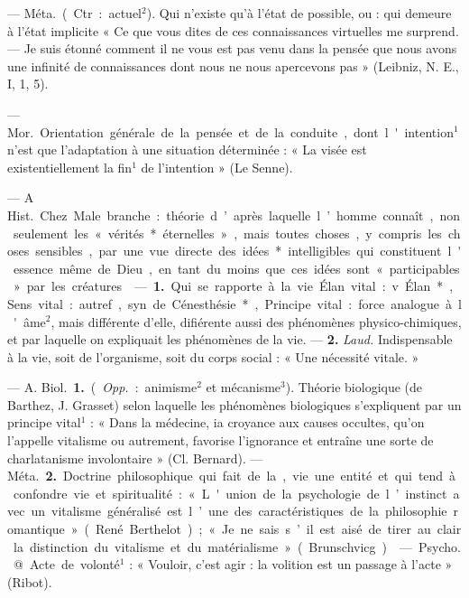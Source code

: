 \begin{itemize}[leftmargin=1cm, label=, itemsep=1pt]
 — \si{Méta.} (Ctr. : actuel$^2$). Qui
n'existe qu’à l’état de possible, ou :
qui demeure à l’état implicite
« Ce que vous dites de ces connaissances virtuelles me surprend. —
Je suis étonné comment il ne vous
est pas venu dans la pensée que
nous avons une infinité de connaissances dont nous ne nous apercevons pas » (Leibniz, N. E., I, 1, 5).

 — \si{Mor.} Orientation générale
de la pensée et de la conduite, dont
l'intention$^1$ n’est que l'adaptation à
une situation déterminée : « La
visée est existentiellement la fin$^1$ de
l'intention » (Le Senne).

 — A \si{Hist.} Chez Male
branche : théorie d’après laquelle
l’homme connaît, non seulement les
« vérités* éternelles », mais toutes
choses, y compris les choses sensibles, par une vue directe des idées*
intelligibles qui constituent l'essence
même de Dieu, en tant du moins
que ces idées sont « participables »
par les créatures.

 — {\bf 1.} Qui se rapporte à la vie.
Élan vital : v. Élan*, Sens vital :
autref., syn. de Cénesthésie*, Principe vital : force analogue à l'âme$^2$,
mais différente d'elle, difiérente
aussi des phénomènes physico-chimiques, et par laquelle on expliquait les phénomènes de la vie. —
 {\bf 2.} {\it Laud.} Indispensable à la vie,
soit de l’organisme, soit du corps
social : « Une nécessité vitale. »

 — A. \si{Biol.} {\bf 1.} ({\it Opp.} : animisme$^2$ et mécanisme$^3$). Théorie biologique (de Barthez, J. Grasset)
selon laquelle les phénomènes biologiques s'expliquent par un principe
vital$^1$ : « Dans la médecine, ia
croyance aux causes occultes, qu’on
l'appelle vitalisme ou autrement,
favorise l'ignorance et entraîne une
sorte de charlatanisme involontaire » (Cl. Bernard). — \si{Méta.}
 {\bf 2.} Doctrine philosophique qui fait
de la,vie une entité et qui tend à
confondre vie et spiritualité :

« L'union de la psychologie de l’instinct avec un vitalisme généralisé
est l’une des caractéristiques de la
philosophie romantique » (René
Berthelot) ; « Je ne sais s’il est
aisé de tirer au clair la distinction
du vitalisme et du matérialisme »
(Brunschvicg).

 — \si{Psycho.} @ Acte de volonté$^1$ :
« Vouloir, c’est agir : la volition est
un passage à l'acte » (Ribot).


\end{itemize}
